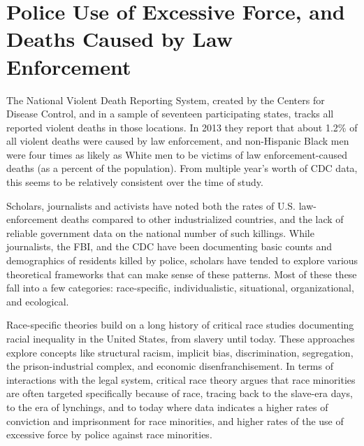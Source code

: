 \documentclass[sigconf]{acmart}
\begin{document}
\section{Police Use of Excessive Force, and Deaths Caused by Law Enforcement}
The National Violent Death Reporting System, created by the Centers for Disease Control, and  in a sample of seventeen participating states, tracks all reported violent deaths in those locations.  In 2013 they report that about 1.2\% of all violent deaths were caused by law enforcement, and non-Hispanic Black men were four times as likely as White men to be victims of law enforcement-caused deaths (as a percent of the population). \cite{cdc13}  From multiple year's worth of CDC data, this seems to be relatively consistent over the time of study.  

Scholars, journalists and activists have noted both the rates of U.S. law-enforcement deaths compared to other industrialized countries, and the lack of reliable government data on the national number of such killings. \cite{currie16,pridemore05,dalton17,lartey15,ser16}  While journalists, the FBI, and the CDC have been documenting basic counts and demographics of residents killed by police, scholars have tended to explore various theoretical frameworks that can make sense of these patterns.  Most of these these fall into a few categories: race-specific, individualistic, situational, organizational, and ecological. \cite{nix17,provine11,smith14,chaney13}

Race-specific theories build on a long history of critical race studies documenting racial inequality in the United States, from slavery until today. \cite{provine11,chaney13,meeks06,crichlow14,payne17}  These approaches explore concepts like structural racism, implicit bias, discrimination, segregation, the prison-industrial complex, and economic disenfranchisement.  In terms of interactions with the legal system, critical race theory argues that race minorities are often targeted specifically because of race, tracing back to the slave-era days, to the era of lynchings, and to today where data indicates a higher rates of conviction and imprisonment for race minorities, and higher rates of the use of excessive force by police against race minorities.  \cite{payne17,provine11,meeks06,chaney13,crichlow14,petro03}  
\end{document}
